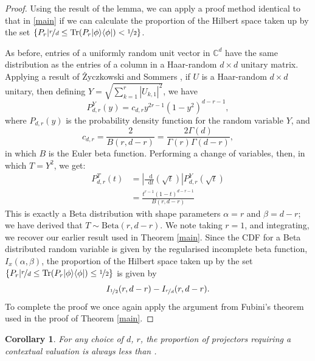 \documentclass{amsart}
\newtheorem{cor}{Corollary}
\theoremstyle{definition}
\DeclareMathOperator{\tr}{Tr}
\newcommand{\ketbra}[1]{{\left\vert {#1}\middle\rangle\middle\langle{#1}\right\vert}}
\newcommand*\dif{\mathop{}\!\mathrm{d}}
\begin{document}
\begin{proof}
Using the result of the lemma, we can apply a proof method identical to that in \ref{main} if we can calculate the proportion of the Hilbert space taken up by the set $\left\{P_r\middle|\nicefrac{r}{d}\leq \tr(P_r\ketbra{\phi})<\nicefrac12\right\}$.

As before, entries of a uniformly random unit vector in $\mathbb{C}^d$ have the same distribution as the entries of a column in a Haar-random $d\times d$ unitary matrix. Applying a result of \.{Z}yczkowski and Sommers \cite{Zycz2000}, if $U$ is a Haar-random $d\times d$ unitary, then defining $Y=\sqrt{\sum_{k=1}^r\left|U_{k,1}\right|^2}$, we have
\begin{equation}
P^Y_{d,r}(y)=c_{d,r}y^{2r-1}(1-y^2)^{d-r-1},
\end{equation}
where $P_{d,r}(y)$ is the probability density function for the random variable $Y$, and
\begin{equation}
c_{d,r}=\frac{2}{B\left(r,d-r\right)}=\frac{2\Gamma(d)}{\Gamma(r)\Gamma(d-r)},
\end{equation}
in which $B$ is the Euler beta function. Performing a change of variables, then, in which $T=Y^2$, we get: 
\begin{align}
P^T_{d,r}(t)&=\left|\frac{\dif}{\dif t}\left(\sqrt{t}\right)\right|P^Y_{d,r}\left(\sqrt{t}\right)\\
&=\frac{t^{r-1}\left(1-t\right)^{d-r-1}}{B(r,d-r)}
\end{align}
This is exactly a Beta distribution with shape parameters $\alpha=r$ and $\beta=d-r$; we have derived that $T\sim\mbox{Beta}(r,d-r)$. We note taking $r=1$, and integrating, we recover our earlier result used in Theorem \ref{main}. Since the CDF for a Beta distributed random variable is given by the regularised incomplete beta function, $I_x(\alpha,\beta)$, the proportion of the Hilbert space taken up by the set $\left\{P_r\middle|\nicefrac{r}{d}\leq \tr(P_r\ketbra{\phi})\leq\nicefrac12\right\}$ is given by
\begin{equation}
I_{\nicefrac{1}{2}}(r,d-r)-I_{\nicefrac{r}{d}}(r,d-r).
\end{equation}
To complete the proof we once again apply the argument from Fubini's theorem used in the proof of Theorem \ref{main}.
\end{proof}
\begin{cor}
For any choice of $d$, $r$, the proportion of projectors requiring a contextual valuation is always less than .
\end{cor}
\end{document}
